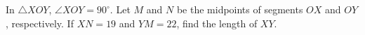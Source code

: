 In $\triangle XOY$, $\angle XOY=90^{\circ}$. Let $M$ and $N$ be the midpoints of segments $OX$ and $OY$, respectively. If $XN=19$ and $YM=22$, find the length of $XY$.
